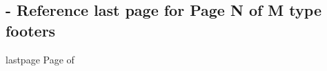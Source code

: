 
\subsection{ - Reference last page for Page N of M type footers}

\begin{demo}{}{lastpage}
	Page \thepage{} of \pageref{LastPage}
\end{demo}

